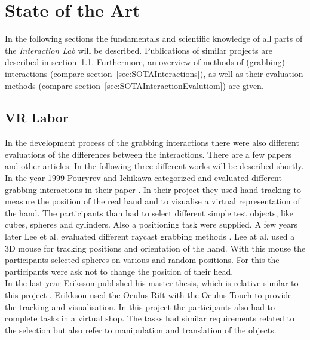 \section{State of the Art} \label{sec:StateOfTheArt}
In the following sections the fundamentals and scientific knowledge of all parts of the \textit{Interaction Lab} will be described. Publications of similar projects are described in section~\ref{sec:SOTALabor}. Furthermore, an overview of methods of  (grabbing) interactions (compare section~\ref{sec:SOTAInteractions}), as well as their evaluation methods (compare section~\ref{sec:SOTAInteractionEvalutiom}) are given. 


\subsection{VR Labor}\label{sec:SOTALabor}
In the development process of the grabbing interactions there were also different evaluations of the differences between the interactions. There are a few papers and other articles. In the following three different works will be described shortly. \\
In the year 1999 Pouryrev and Ichikawa categorized and evaluated different grabbing interactions in their paper \cite{POUPYREV199919}. In their project they used hand tracking to measure the position of the real hand and to visualise a virtual representation of the hand. The participants than had to select different simple test objects, like cubes, spheres and cylinders. Also a positioning task were supplied. %
A few years later Lee et al. evaluated different raycast grabbing methods \cite{lee2003evaluation}. Lee at al. used a 3D mouse for tracking positions and orientation of the hand. With this mouse the participants selected spheres on various and random positions. For this the participants were ask not to change the position of their head.\\
In the last year Eriksson published his master thesis, which is relative similar to this project \cite{eriksson2016reaching}. Erikkson used the Oculus Rift with the Oculus Touch to provide the tracking and visualisation. In this project the participants also had to complete tasks in a virtual shop. The tasks had similar requirements related to the selection but also refer to manipulation and translation of the objects. 

